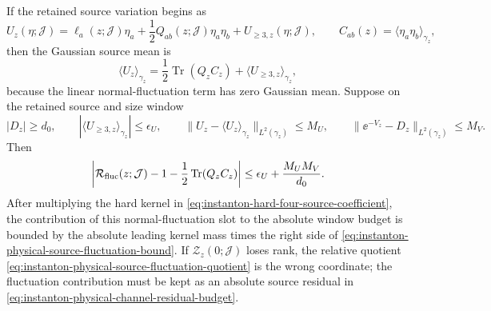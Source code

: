 \begin{controlledapproximation}
If the retained source variation begins as
\begin{equation}
  U_z(\eta;\mathcal J)
  =
  \ell_a(z;\mathcal J)\eta_a
  +\frac12Q_{ab}(z;\mathcal J)\eta_a\eta_b
  +U_{\ge3,z}(\eta;\mathcal J),
  \qquad
  C_{ab}(z)=\langle\eta_a\eta_b\rangle_{\gamma_z},
  \label{eq:instanton-physical-gaussian-source-expansion}
\end{equation}
then the Gaussian source mean is
\[
  \langle U_z\rangle_{\gamma_z}
  =
  \frac12\operatorname{Tr}(Q_zC_z)
  +\langle U_{\ge3,z}\rangle_{\gamma_z},
\]
because the linear normal-fluctuation term has zero Gaussian mean.  Suppose
on the retained source and size window
\[
  |D_z|\ge d_0,\qquad
  |\langle U_{\ge3,z}\rangle_{\gamma_z}|\le\epsilon_U,\qquad
  \|U_z-\langle U_z\rangle_{\gamma_z}\|_{L^2(\gamma_z)}\le M_U,
  \qquad
  \|\ee^{-V_z}-D_z\|_{L^2(\gamma_z)}\le M_V .
\]
Then
\begin{equation}
  \left|
    \mathcal R_{\rm fluc}(z;\mathcal J)
    -
    1
    -
    \frac12\operatorname{Tr}(Q_zC_z)
  \right|
  \le
  \epsilon_U+\frac{M_UM_V}{d_0}.
  \label{eq:instanton-physical-source-fluctuation-bound}
\end{equation}
After multiplying the hard kernel in
\eqref{eq:instanton-hard-four-source-coefficient}, the contribution of this
normal-fluctuation slot to the absolute window budget is bounded by the
absolute leading kernel mass times the right side of
\eqref{eq:instanton-physical-source-fluctuation-bound}.  If
\(\mathcal Z_z(0;\mathcal J)\) loses rank, the relative quotient
\eqref{eq:instanton-physical-source-fluctuation-quotient} is the wrong
coordinate; the fluctuation contribution must be kept as an absolute source
residual in \eqref{eq:instanton-physical-channel-residual-budget}.
\end{controlledapproximation}

